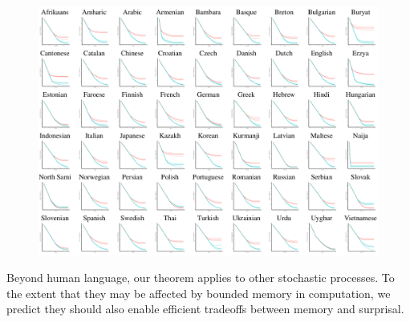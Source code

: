 \documentclass[11pt,letterpaper]{article}
\newcounter{theorem}
\begin{document}
\begin{figure}
\includegraphics[width=\textwidth]{figures/full-results.png}
	\caption{}\label{fig:results}
\end{figure}


Beyond human language, our theorem applies to other stochastic processes.
To the extent that they may be affected by bounded memory in computation, we predict they should also enable efficient tradeoffs between memory and surprisal.
\end{document}
